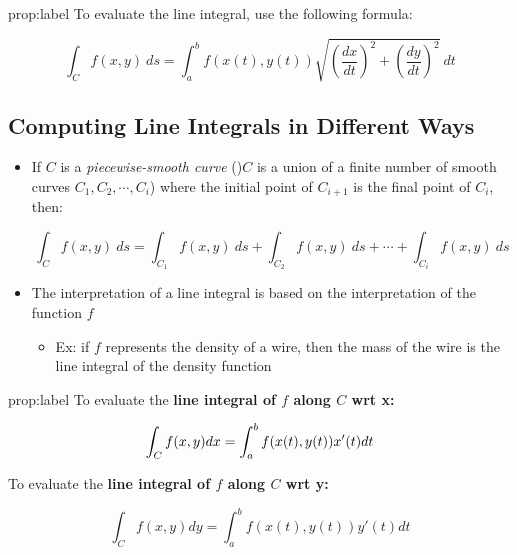 \documentclass{package/notes}
\begin{document}
\begin{proposition}{prop:label}
	To evaluate the line integral, use the following formula:

	$$\int_Cf(x,y)\:ds=\int_a^bf(x(t),y(t))\sqrt{\left(\frac{dx}{dt}\right)^2+\left(\frac{dy}{dt}\right)^2}\:dt$$
\end{proposition}


\subsection{Computing Line Integrals in Different Ways}

\begin{itemize}
	\item If $C$ is a \textit{piecewise-smooth curve} ()$C$ is a union of a finite number of smooth curves $C_1,C_2,\cdots,C_i$) where the initial point of $C_{i+1}$ is the final point of $C_i$, then:
	
	$$\int_Cf(x,y)\:ds = \int_{C_1}f(x,y)\:ds + \int_{C_2}f(x,y)\:ds+\cdots+\int_{C_i}f(x,y)\:ds$$

	\item The interpretation of a line integral is based on the interpretation of the function $f$
	\begin{itemize}
		\item Ex: if $f$ represents the density of a wire, then the mass of the wire is the line integral of the density function
	\end{itemize}
\end{itemize}

\begin{proposition}{prop:label}
	To evaluate the \textbf{line integral of $f$ along $C$ wrt x:}

	$$\int_Cf(x,y)dx=\int_a^bf(x(t),y(t))x'(t)dt\\$$

	To evaluate the \textbf{line integral of $f$ along $C$ wrt y:}

	$$\int_Cf(x,y)dy=\int_a^bf(x(t),y(t))y'(t)dt$$
\end{proposition}
\end{document}
